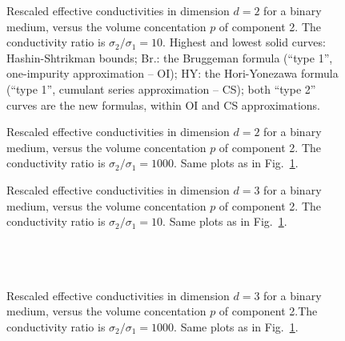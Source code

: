 \twocolumn
\begin{figure}
\narrowtext
\vspace*{0.0cm}
\centerline{ }
\vspace*{0.3cm}
\caption{Rescaled effective conductivities in dimension $d=2$  for a binary medium, versus the volume concentation $p$ of  component 2. The conductivity ratio is $\sigma_2/\sigma_1=10$.  Highest and lowest solid curves: Hashin-Shtrikman bounds; Br.:  the Bruggeman formula (``type 1'', one-impurity  approximation -- OI); HY: the Hori-Yonezawa formula (``type 1'', cumulant series approximation -- CS); both ``type 2'' curves  are the new formulas, within OI and CS approximations.  }
\label{fig1}
\end{figure}

\begin{figure}
\narrowtext
\vspace*{0.0cm}
\centerline{ }
\vspace*{0.3cm}
\caption{Rescaled effective conductivities in dimension $d=2$  for a binary medium, versus the volume concentation $p$ of  component 2. The conductivity ratio is $\sigma_2/\sigma_1=1000$. Same plots as in Fig.\ \ref{fig1}. }
\label{fig2}
\end{figure}

\begin{figure}
\narrowtext
\vspace*{0.0cm}
\centerline{ }
\vspace*{0.3cm}
\caption{Rescaled effective conductivities in dimension $d=3$  for a binary medium, versus the volume concentation $p$ of  component 2. The conductivity ratio is $\sigma_2/\sigma_1=10$. Same plots as in Fig.\ \ref{fig1}.\\ \\ \\ \\ }
\label{fig3}
\end{figure}

\begin{figure}
\narrowtext
\vspace*{0.0cm}
\centerline{ }
\vspace*{0.3cm}
\caption{Rescaled effective conductivities in dimension $d=3$  for a binary medium, versus the volume concentation $p$ of  component 2.The conductivity ratio is $\sigma_2/\sigma_1=1000$. Same plots as in Fig.\ \ref{fig1}. }
\label{fig4}
\end{figure}

